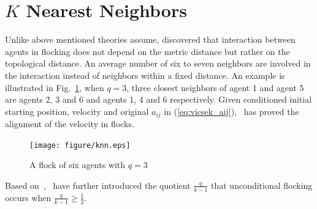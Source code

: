 \section{$K$ Nearest Neighbors}

Unlike above mentioned theories assume, \cite{PNAS} discovered that interaction between agents in flocking does not depend on the metric distance but rather on the topological distance. An average number of six to seven neighbors are involved in the interaction instead of neighbors within a fixed distance. An example is illustrated in Fig.~\ref{fig:knn}, when $q=3$, three closest neighbors of agent 1 and agent 5 are agents 2, 3 and 6 and agents 1, 4 and 6 respectively. Given conditioned initial starting position, velocity and original $a_{ij}$ in (\ref{eq:vicsek_aij}),~\cite{KNN} has proved the alignment of the velocity in flocks.

\begin{figure}[htb]
  \centering
  \texttt{[image: figure/knn.eps]}
  \caption{A flock of six agents with $q=3$}
  \label{fig:knn}
\end{figure}

\noindent
Based on~\cite{KNN},~\cite{CuckerDong2016} have further introduced the quotient $\frac{q}{k-1}$ that unconditional flocking occurs when $\frac{q}{k-1}\geq\frac{1}{2}$.

\newpage
